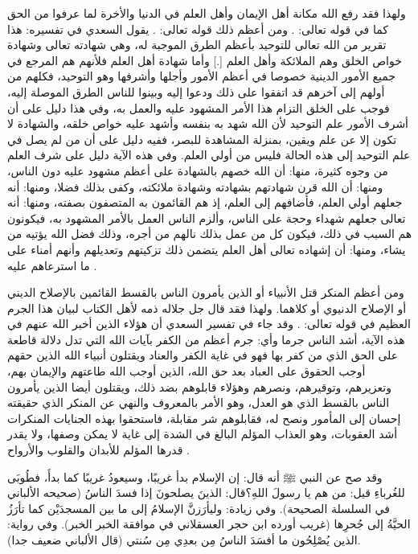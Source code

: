 ولهذا فقد رفع الله مكانة أهل الإيمان وأهل العلم في الدنيا والأخرة لما عرفوا من الحق كما في قوله تعالى:
\quranayah*[58][11][19]{\footnotesize \surahname*[58]}.
ومن أعظم ذلك قوله تعالى:
\quranayah*[3][18]{\footnotesize \surahname*[3]}.
يقول السعدي في تفسيره:
هذا تقرير من الله تعالى للتوحيد بأعظم الطرق الموجبة له، وهي شهادته تعالى وشهادة خواص الخلق وهم الملائكة وأهل العلم [.] وأما شهادة أهل العلم فلأنهم هم المرجع في جميع الأمور الدينية خصوصا في أعظم الأمور وأجلها وأشرفها وهو التوحيد، فكلهم من أولهم إلى آخرهم قد اتفقوا على ذلك ودعوا إليه وبينوا للناس الطرق الموصلة إليه، فوجب على الخلق التزام هذا الأمر المشهود عليه والعمل به، وفي هذا دليل على أن أشرف الأمور علم التوحيد لأن الله شهد به بنفسه وأشهد عليه خواص خلقه، والشهادة لا تكون إلا عن علم ويقين، بمنزلة المشاهدة للبصر، ففيه دليل على أن من لم يصل في علم التوحيد إلى هذه الحالة فليس من أولي العلم. وفي هذه الآية دليل على شرف العلم من وجوه كثيرة، منها: أن الله خصهم بالشهادة على أعظم مشهود عليه دون الناس، ومنها: أن الله قرن شهادتهم بشهادته وشهادة ملائكته، وكفى بذلك فضلا، ومنها: أنه جعلهم أولي العلم، فأضافهم إلى العلم، إذ هم القائمون به المتصفون بصفته، ومنها: أنه تعالى جعلهم شهداء وحجة على الناس، وألزم الناس العمل بالأمر المشهود به، فيكونون هم السبب في ذلك، فيكون كل من عمل بذلك نالهم من أجره، وذلك فضل الله يؤتيه من يشاء، ومنها: أن إشهاده تعالى أهل العلم يتضمن ذلك تزكيتهم وتعديلهم وأنهم أمناء على ما استرعاهم عليه \cite{tafsir_Saadi}.


ومن أعظم المنكر قتل الأنبياء أو الذين يأمرون الناس بالقسط القائمين بالإصلاح الديني أو الإصلاح الدنيوي أو كلاهما. ولهذا فقد قال جل جلاله ذمه لأهل الكتاب لبيان هذا الجرم العظيم في قوله تعالى:
\quranayah*[3][21]{\footnotesize \surahname*[3]}. وقد جاء في تفسير السعدي أن هؤلاء الذين أخبر الله عنهم في هذه الآية، أشد الناس جرما وأي: جرم أعظم من الكفر بآيات الله التي تدل دلالة قاطعة على الحق الذي من كفر بها فهو في غاية الكفر والعناد ويقتلون أنبياء الله الذين حقهم أوجب الحقوق على العباد بعد حق الله، الذين أوجب الله طاعتهم والإيمان بهم، وتعزيرهم، وتوقيرهم، ونصرهم وهؤلاء قابلوهم بضد ذلك، ويقتلون أيضا الذين يأمرون الناس بالقسط الذي هو العدل، وهو الأمر بالمعروف والنهي عن المنكر الذي حقيقته إحسان إلى المأمور ونصح له، فقابلوهم شر مقابلة، فاستحقوا بهذه الجنايات المنكرات أشد العقوبات، وهو العذاب المؤلم البالغ في الشدة إلى غاية لا يمكن وصفها، ولا يقدر قدرها المؤلم للأبدان والقلوب والأرواح \cite{tafsir_Saadi}. 

وقد صح عن النبي ﷺ أنه قال: إن الإسلام بدأ غريبًا، وسيعودُ غريبًا كما بدأَ، فطُوبَى للغُرباءِ قيل: من هم يا رسولَ اللهِ؟قال: الذينَ يصلحونَ إذا فسدَ الناسُ {\footnotesize (صحيحه الألباني في السلسلة الصحيحة)}. وفي زيادة: وليأرَزنَّ الإسلامُ إلى ما بين المسجدَيْن كما تأرَزُ الحيَّةُ إلى جُحرِها {\footnotesize (غريب أورده ابن حجر العسقلاني في موافقة الخبر الخبر)}. وفي رواية: الذين يُصْلِحُون ما أفسَدَ الناسُ مِن بعدِي مِن سُنتي {\footnotesize (قال الألباني ضعيف جدا)}.

